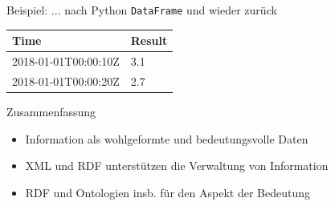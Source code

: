 \documentclass{beamer}
\begin{document}
\begin{frame}[fragile]{Beispiel: ... nach Python \texttt{DataFrame} und wieder zurück}
	
	\begin{table}
		\begin{tabular}{|l|l|}
			\hline
			Time & Result \\
			\hline
			2018-01-01T00:00:10Z & 3.1 \\
			2018-01-01T00:00:20Z & 2.7 \\
			\hline
		\end{tabular}
	\end{table}
	
\end{frame}

\begin{frame}{Zusammenfassung}
	
	\begin{itemize}
		\item Information als wohlgeformte und bedeutungsvolle Daten
		\item XML und RDF unterstützen die Verwaltung von Information
		\item RDF und Ontologien insb. für den Aspekt der Bedeutung
	\end{itemize}
	
\end{frame}
\end{document}
